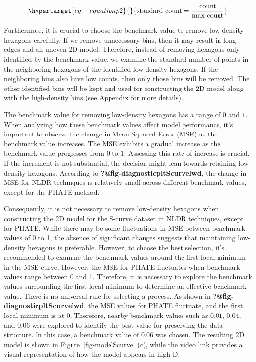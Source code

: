 \documentclass[
  12pt]{article}
\begin{document}
\begin{equation}\protect\hypertarget{eq-equationp2}{}{
\text{standard count} = \frac{\text{count}}{\text{max count}} 
}\label{eq-equationp2}\end{equation}

Furthermore, it is crucial to choose the benchmark value to remove
low-density hexagons carefully. If we remove unnecessary bins, then it
may result in long edges and an uneven 2D model. Therefore, instead of
removing hexagons only identified by the benchmark value, we examine the
standard number of points in the neighboring hexagons of the identified
low-density hexagons. If the neighboring bins also have low counts, then
only those bins will be removed. The other identified bins will be kept
and used for constructing the 2D model along with the high-density bins
(see Appendix for more details).

The benchmark value for removing low-density hexagons has a range of
\(0\) and \(1\). When analyzing how these benchmark values affect model
performance, it's important to observe the change in Mean Squared Error
(MSE) as the benchmark value increases. The MSE exhibits a gradual
increase as the benchmark value progresses from \(0\) to \(1\).
Assessing this rate of increase is crucial. If the increment is not
substantial, the decision might lean towards retaining low-density
hexagons. According to \textbf{?@fig-diagnosticpltScurvelwd}, the change
in MSE for NLDR techniques is relatively small across different
benchmark values, except for the PHATE method.

Consequently, it is not necessary to remove low-density hexagons when
constructing the 2D model for the S-curve dataset in NLDR techniques,
except for PHATE. While there may be some fluctuations in MSE between
benchmark values of 0 to 1, the absence of significant changes suggests
that maintaining low-density hexagons is preferable. However, to choose
the best selection, it's recommended to examine the benchmark values
around the first local minimum in the MSE curve. However, the MSE for
PHATE fluctuates when benchmark values range between 0 and 1. Therefore,
it is necessary to explore the benchmark values surrounding the first
local minimum to determine an effective benchmark value. There is no
universal rule for selecting a process. As shown in
\textbf{?@fig-diagnosticpltScurvelwd}, the MSE values for PHATE
fluctuate, and the first local minimum is at \(0\). Therefore, nearby
benchmark values such as \(0.01\), \(0.04\), and \(0.06\) were explored
to identify the best value for preserving the data structure. In this
case, a benchmark value of \(0.06\) was chosen. The resulting 2D model
is shown in Figure~\ref{fig-modelScurve} (c), while the video link
provides a visual representation of how the model appears in high-D.
\end{document}
